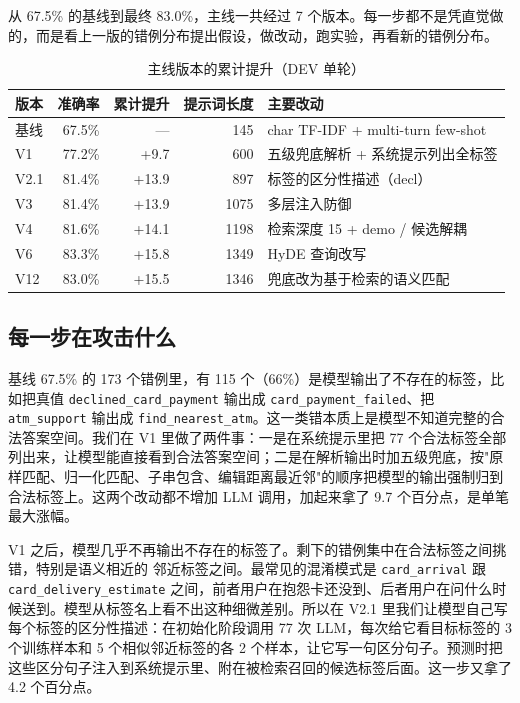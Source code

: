 \documentclass[11pt,a4paper]{article}
\begin{document}
从 67.5\% 的基线到最终 83.0\%，主线一共经过 7 个版本。每一步都不是凭直觉做的，而是看上一版的错例分布提出假设，做改动，跑实验，再看新的错例分布。

\begin{table}[h]
\centering
\caption{主线版本的累计提升（DEV 单轮）}
\label{tab:main-progression}
\small
\begin{tabular}{lrrrl}
\toprule
版本 & 准确率 & 累计提升 & 提示词长度 & 主要改动 \\
\midrule
基线   & 67.5\% & ---    & 145  & char TF-IDF + multi-turn few-shot \\
V1   & 77.2\% & +9.7   & 600  & 五级兜底解析 + 系统提示列出全标签 \\
V2.1 & 81.4\% & +13.9  & 897  & 标签的区分性描述（decl）\\
V3   & 81.4\% & +13.9  & 1075 & 多层注入防御 \\
V4   & 81.6\% & +14.1  & 1198 & 检索深度 15 + demo / 候选解耦 \\
V6   & 83.3\% & +15.8  & 1349 & HyDE 查询改写 \\
V12  & 83.0\% & +15.5  & 1346 & 兜底改为基于检索的语义匹配 \\
\bottomrule
\end{tabular}
\end{table}

\subsection{每一步在攻击什么}

基线 67.5\% 的 173 个错例里，有 115 个（66\%）是模型输出了不存在的标签，比如把真值 \texttt{declined\_card\_payment} 输出成 \texttt{card\_payment\_failed}、把 \texttt{atm\_support} 输出成 \texttt{find\_nearest\_atm}。这一类错本质上是模型不知道完整的合法答案空间。我们在 V1 里做了两件事：一是在系统提示里把 77 个合法标签全部列出来，让模型能直接看到合法答案空间；二是在解析输出时加五级兜底，按"原样匹配、归一化匹配、子串包含、编辑距离最近邻"的顺序把模型的输出强制归到合法标签上。这两个改动都不增加 LLM 调用，加起来拿了 9.7 个百分点，是单笔最大涨幅。

V1 之后，模型几乎不再输出不存在的标签了。剩下的错例集中在合法标签之间挑错，特别是语义相近的 邻近标签之间。最常见的混淆模式是 \texttt{card\_arrival} 跟 \texttt{card\_delivery\_estimate} 之间，前者用户在抱怨卡还没到、后者用户在问什么时候送到。模型从标签名上看不出这种细微差别。所以在 V2.1 里我们让模型自己写每个标签的区分性描述：在初始化阶段调用 77 次 LLM，每次给它看目标标签的 3 个训练样本和 5 个相似邻近标签的各 2 个样本，让它写一句区分句子。预测时把这些区分句子注入到系统提示里、附在被检索召回的候选标签后面。这一步又拿了 4.2 个百分点。
\end{document}
